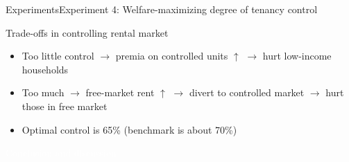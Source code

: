 \documentclass[11pt,aspectratio=169]{beamer}
\begin{document}
\begin{frame}{Experiments}{Experiment 4: Welfare-maximizing degree of tenancy control}

Trade-offs in controlling rental market
\begin{itemize}
    \item Too little control $\rightarrow$ premia on controlled units $\uparrow$ $\rightarrow$ hurt low-income households
    \item Too much $\rightarrow$ free-market rent $\uparrow$ $\rightarrow$ divert to controlled market $\rightarrow$ hurt those in free market
\end{itemize}

\vspace{0.3cm}

\begin{itemize}
    \item Optimal control is 65\% (benchmark is about 70\%)
\end{itemize}

\end{frame}

{
\begin{frame}{}

\centering \Large
\textcolor{white}{Conclusion and discussion}
    
\end{frame}

}
\end{document}
